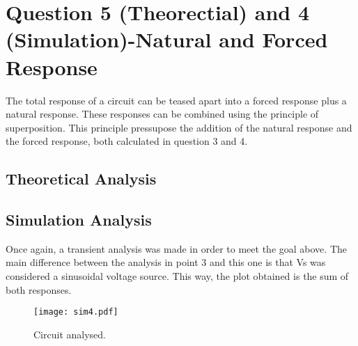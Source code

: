 \section{Question 5 (Theorectial) and 4 (Simulation)-Natural and Forced Response}

The total response of a circuit can be teased apart into a forced response plus a natural response. These responses can be combined using the principle of superposition. This principle pressupose the addition of the natural response and the forced response, both calculated in question 3 and 4.

\subsection{Theoretical Analysis}



\subsection{Simulation Analysis}
Once again, a transient analysis was made in order to meet the goal above. The main difference between the analysis in point 3 and this one is that Vs was considered a sinusoidal voltage source. This way, the plot obtained is the sum of both responses.

\begin{figure}[ht] \centering
\texttt{[image: sim4.pdf]}
\caption{Circuit analysed.}
\label{fig:sim4}
\end{figure}

